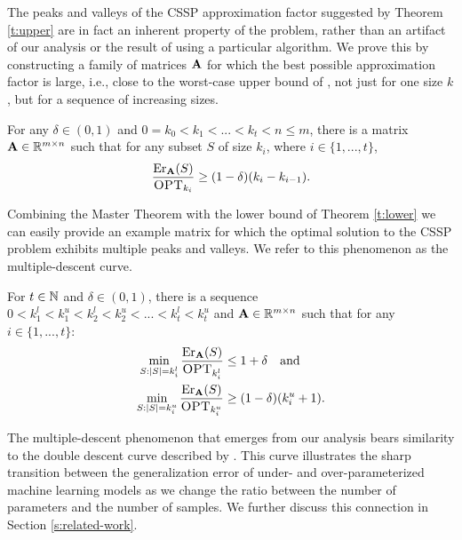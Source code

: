 \documentclass{article}
\begin{document}
The peaks and valleys of the CSSP approximation
factor suggested by Theorem \ref{t:upper} are in fact an
inherent property of the problem, rather than an artifact of our
analysis or the result of using a particular algorithm. We prove this by
constructing a family of matrices $\mathbf A$ for which the best possible approximation
factor is large, i.e., close to the worst-case upper bound of
\citet{pca-volume-sampling}, not just for one size $k$, but for a
sequence of increasing sizes.
 \begin{theorem}\label{t:lower}
For any $\delta\in(0,1)$ and
$0\!=\!k_0\!<\!k_1\!<\!...\!<\!k_t\!<\!n\leq m$, there is a matrix 
$\mathbf A\in\mathbb R^{m\times n}$ such that for any subset $S$ of size $k_i$,
where $i\in\{1,...,t\}$,
\begin{align*}
\frac{\mathrm{Er}_{\mathbf A}(S)}{\textsc{OPT}_{k_i}}\geq (1-\delta)(k_i-k_{i-1}).
  \end{align*}
\end{theorem}
Combining the Master Theorem with the lower
bound of Theorem \ref{t:lower} we can easily provide an example matrix
for which the optimal solution to the CSSP problem exhibits multiple
peaks and valleys. We refer to this phenomenon as the multiple-descent curve.
\begin{corollary}\label{c:multiple-descent}
  For $t\in\mathbb N$ and $\delta\in(0,1)$, there is a
  sequence $0<k_1^l<k_1^u<k_2^l<k_2^u<...<k_t^l<k_t^u$ and
  $\mathbf A\in\mathbb R^{m\times n}$ such that for any $i\in\{1,...,t\}$:
  \begin{align*}
    \min_{S:|S|=k_i^l}\frac{\mathrm{Er}_\mathbf A(S)}{\textsc{OPT}_{k_i^l}}&\leq 1+\delta
                                 \quad\text{and }\\
    \min_{S:|S|=k_i^u}\frac{\mathrm{Er}_\mathbf A(S)}{\textsc{OPT}_{k_i^u}} &\geq
    (1-\delta)(k_i^u+1).
  \end{align*}
\end{corollary}
The multiple-descent phenomenon that emerges from our analysis bears
similarity to the double descent curve 
described by \citet{BHMM19}. This curve illustrates the sharp transition
between the generalization error of under- and over-parameterized machine
learning models as we change the ratio between the number of parameters 
and the number of samples. We further discuss this connection in
Section \ref{s:related-work}.
\end{document}
